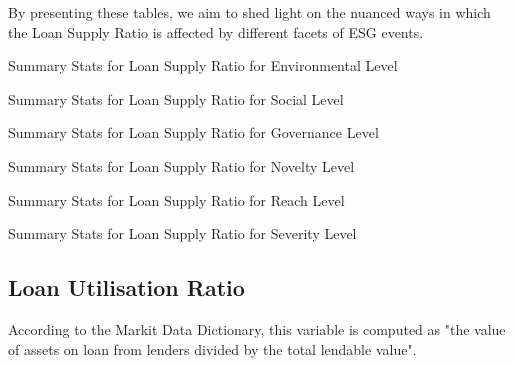 By presenting these tables, we aim to shed light on the nuanced ways in which the Loan Supply Ratio is affected by different facets of ESG events.

\begin{table}[H]
\caption{Summary Stats for Loan Supply Ratio for Environmental Level}
\centering

\label{table:loan_supply_ratio_environment.tex}
\end{table}

\begin{table}[H]
\caption{Summary Stats for Loan Supply Ratio for Social Level}
\centering

\label{table:loan_supply_ratio_social.tex}
\end{table}

\begin{table}[H]
\caption{Summary Stats for Loan Supply Ratio for Governance Level}
\centering

\label{table:loan_supply_ratio_governance.tex}
\end{table}


\begin{table}[H]
\caption{Summary Stats for Loan Supply Ratio for Novelty Level}
\centering

\label{table:loan_supply_ratio_novelty.tex}
\end{table}

\begin{table}[H]
\caption{Summary Stats for Loan Supply Ratio for Reach Level}
\centering

\label{table:loan_supply_ratio_reach.tex}
\end{table}

\begin{table}[H]
\caption{Summary Stats for Loan Supply Ratio for Severity Level}
\centering

\label{table:loan_supply_ratio_severity.tex}
\end{table}



\subsection{Loan Utilisation Ratio}

According to the Markit Data Dictionary, this variable is computed as "the value of assets on loan from lenders divided by the total lendable value".


